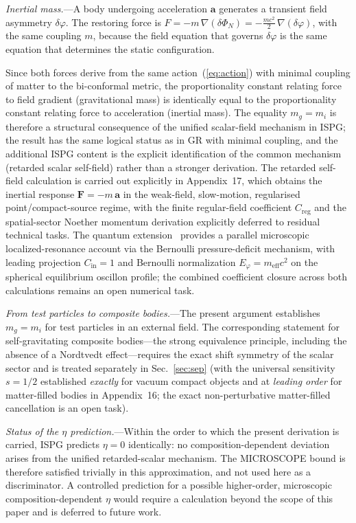 \documentclass[aps,prd,onecolumn,superscriptaddress,nofootinbib,showpacs,12pt]{revtex4-2}
\begin{document}
\textit{Inertial mass.}---A body undergoing acceleration
$\mathbf{a}$ generates a transient field asymmetry
$\delta\varphi$.  The restoring force is
$F = -m\,\nabla(\delta\Phi_{N})
   = -\tfrac{mc^{2}}{2}\,\nabla(\delta\varphi)$,
with the same coupling $m$, because the field equation
that governs $\delta\varphi$ is the same equation that
determines the static configuration.

Since both forces derive from the same
action~(\ref{eq:action}) with minimal coupling of matter
to the bi-conformal metric, the proportionality constant
relating force to field gradient (gravitational mass) is
identically equal to the proportionality constant
relating force to acceleration (inertial mass).  The
equality $m_{g} = m_{i}$ is therefore a structural
consequence of the unified scalar-field mechanism in
ISPG; the result has the same logical status as in GR
with minimal coupling, and the additional ISPG content
is the explicit identification of the common mechanism
(retarded scalar self-field) rather than a stronger
derivation.
The retarded self-field calculation is carried out
explicitly in Appendix~17, which obtains the inertial
response $\mathbf{F} = -m\,\mathbf{a}$ in the
weak-field, slow-motion, regularised point/compact-source
regime, with the finite regular-field coefficient
$C_{\mathrm{reg}}$ and the spatial-sector Noether
momentum derivation explicitly deferred to residual
technical tasks.  The quantum
extension~\cite{Lotishvili2026Q} provides a parallel
microscopic localized-resonance account via the
Bernoulli pressure-deficit mechanism, with leading
projection $C_{\mathrm{in}}=1$ and Bernoulli
normalization $E_\varphi = m_{\mathrm{eff}} c^{2}$ on
the spherical equilibrium oscillon profile; the
combined coefficient closure across both calculations
remains an open numerical task.

\textit{From test particles to composite bodies.}---The
present argument establishes $m_{g} = m_{i}$ for test
particles in an external field.  The corresponding
statement for self-gravitating composite bodies---the
strong equivalence principle, including the absence of
a Nordtvedt effect---requires the exact shift symmetry
of the scalar sector and is treated separately in
Sec.~\ref{sec:sep} (with the universal sensitivity
$s = 1/2$ established \emph{exactly} for vacuum compact
objects and at \emph{leading order} for matter-filled
bodies in Appendix~16; the exact non-perturbative
matter-filled cancellation is an open task).

\textit{Status of the $\eta$ prediction.}---Within the
order to which the present derivation is carried,
ISPG predicts $\eta = 0$ identically: no
composition-dependent deviation arises from the unified
retarded-scalar mechanism.  The MICROSCOPE bound is
therefore satisfied trivially in this approximation,
and not used here as a discriminator.  A controlled
prediction for a possible higher-order, microscopic
composition-dependent $\eta$ would require a calculation
beyond the scope of this paper and is deferred to
future work.
\end{document}
